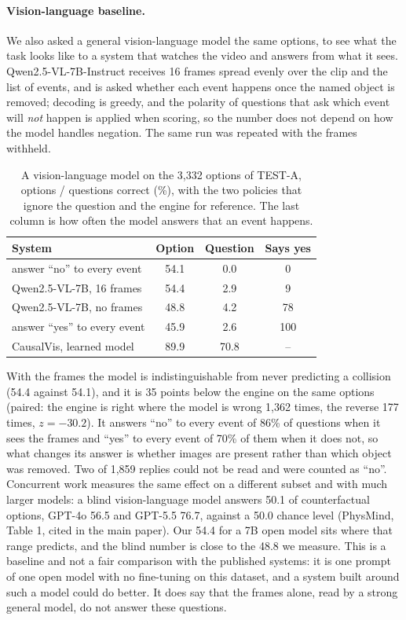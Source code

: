 \documentclass[10pt,onecolumn,letterpaper]{article}
\newcommand{\sys}{CausalVis}
\begin{document}
\paragraph{Vision-language baseline.}
We also asked a general vision-language model the same options, to see what the task looks like to a system that watches the video and answers from what it sees.
Qwen2.5-VL-7B-Instruct receives 16 frames spread evenly over the clip and the list of events, and is asked whether each event happens once the named object is removed; decoding is greedy, and the polarity of questions that ask which event will \emph{not} happen is applied when scoring, so the number does not depend on how the model handles negation.
The same run was repeated with the frames withheld.

\begin{table}[h]
\caption{A vision-language model on the 3,332 options of TEST-A, options / questions correct (\%), with the two policies that ignore the question and the engine for reference. The last column is how often the model answers that an event happens.}
\label{tab:vlm}
\centering
\small
\begin{tabular}{@{}lccc@{}}
\toprule
System & Option & Question & Says yes \\
\midrule
answer ``no'' to every event & 54.1 & 0.0 & 0 \\
Qwen2.5-VL-7B, 16 frames & 54.4 & 2.9 & 9 \\
Qwen2.5-VL-7B, no frames & 48.8 & 4.2 & 78 \\
answer ``yes'' to every event & 45.9 & 2.6 & 100 \\
\midrule
\sys{}, learned model & 89.9 & 70.8 & -- \\
\bottomrule
\end{tabular}
\end{table}

With the frames the model is indistinguishable from never predicting a collision (54.4 against 54.1), and it is 35 points below the engine on the same options (paired: the engine is right where the model is wrong 1,362 times, the reverse 177 times, $z = -30.2$).
It answers ``no'' to every event of 86\% of questions when it sees the frames and ``yes'' to every event of 70\% of them when it does not, so what changes its answer is whether images are present rather than which object was removed.
Two of 1,859 replies could not be read and were counted as ``no''.
Concurrent work measures the same effect on a different subset and with much larger models: a blind vision-language model answers 50.1 of counterfactual options, GPT-4o 56.5 and GPT-5.5 76.7, against a 50.0 chance level (PhysMind, Table 1, cited in the main paper).
Our 54.4 for a 7B open model sits where that range predicts, and the blind number is close to the 48.8 we measure.
This is a baseline and not a fair comparison with the published systems: it is one prompt of one open model with no fine-tuning on this dataset, and a system built around such a model could do better.
It does say that the frames alone, read by a strong general model, do not answer these questions.
\end{document}
